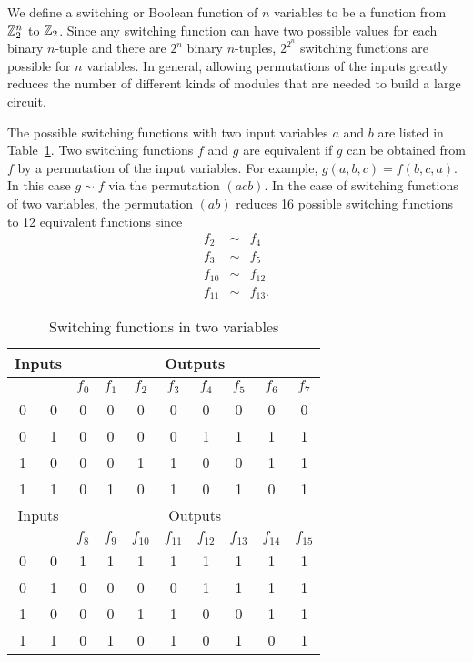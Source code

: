  
We define a {\bfi
switching\/} or
{\bfi Boolean
function\/} of $n$
variables to be a function from ${\Bbb Z}_2^n$ to ${\Bbb Z}_2$. Since 
any switching function can have two possible values for each binary
$n$-tuple and there are $2^n$ binary $n$-tuples, $2^{2^n}$ switching
functions are possible for $n$ variables. In general, allowing
permutations of the inputs greatly reduces the number of different
kinds of modules that are needed to build a large circuit.
 
 
The possible switching functions  with two input variables $a$ and
$b$ are listed in Table~\ref{switching_2variable}. Two switching functions $f$ and $g$
are equivalent if $g$ can be obtained from $f$ by a permutation of the
input variables. For example, $g(a, b, c) = f(b, c, a)$. In this 
case $g \sim f$ via the permutation $(acb)$. In the case of switching
functions of two variables, the permutation $(ab)$ reduces 16
possible switching functions to 12 equivalent functions since
\begin{eqnarray*}
f_2 & \sim & f_4 \\
f_3 & \sim & f_5 \\
f_{10} & \sim & f_{12} \\
f_{11} & \sim & f_{13}.
\end{eqnarray*}
 
 
\begin{table}[htb]\label{switching_2variable}
\caption{Switching functions in two variables}{\small
\medskip
\begin{center}
\begin{tabular}{|cc|cccccccc|}
\hline
\multicolumn{2}{|c|}{Inputs}
 & \multicolumn{8}{|c|}{Outputs}    \\
\hline
         &     & $f_0$ & $f_1$ & $f_2$ & $f_3$ & $f_4$ &
$f_5$ & $f_6$ & $f_7$  \\ \hline
0 & 0   & 0 & 0 & 0 & 0 & 0 & 0 & 0 & 0 \\
0 & 1   & 0 & 0 & 0 & 0 & 1 & 1 & 1 & 1 \\
1 & 0   & 0 & 0 & 1 & 1 & 0 & 0 & 1 & 1 \\
1 & 1   & 0 & 1 & 0 & 1 & 0 & 1 & 0 & 1 \\ \hline\hline
\multicolumn{2}{|c|}{Inputs}
 & \multicolumn{8}{|c|}{Outputs}    \\
\hline
         &     & $f_8$ & $f_9$ & $f_{10}$ & $f_{11}$
& $f_{12}$ & $f_{13}$ & $f_{14}$ & $f_{15}$ \\ \hline
0 & 0   & 1 & 1 & 1 & 1 & 1 & 1 & 1 & 1 \\
0 & 1   & 0 & 0 & 0 & 0 & 1 & 1 & 1 & 1 \\
1 & 0   & 0 & 0 & 1 & 1 & 0 & 0 & 1 & 1 \\
1 & 1   & 0 & 1 & 0 & 1 & 0 & 1 & 0 & 1 \\ \hline
\end{tabular}
\end{center}
}
\end{table}
 
